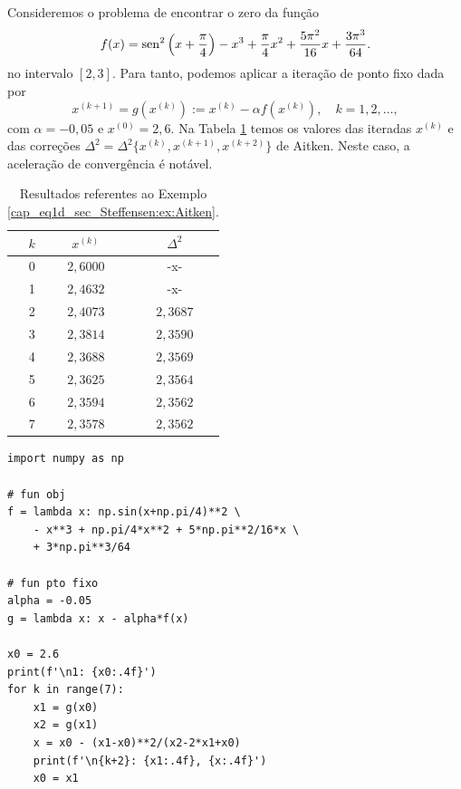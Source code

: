 \begin{ex}\label{cap_eq1d_sec_Steffensen:ex:Aitken}
  Consideremos o problema de encontrar o zero da função
  \begin{equation}
    f(x) = \operatorname{sen}^2\left(x+\frac{\pi}{4}\right) - x^3 + \frac{\pi}{4}x^2 + \frac{5\pi^2}{16}x + \frac{3\pi^3}{64}.
  \end{equation}
  no intervalo $[2,3]$. Para tanto, podemos aplicar a iteração de ponto fixo dada por
  \begin{equation}
    x^{(k+1)} = g(x^{(k)}) := x^{(k)} - \alpha f(x^{(k)}),\quad k=1,2,\ldots,
  \end{equation}
com $\alpha=-0,05$ e $x^{(0)}=2,6$. Na Tabela \ref{cap_eq1d_sec_Steffensen:tab:ex_Aitken} temos os valores das iteradas $x^{(k)}$ e das correções $\Delta^2 = \Delta^2\{x^{(k)},x^{(k+1)},x^{(k+2)}\}$ de Aitken. Neste caso, a aceleração de convergência é notável.

\begin{table}[H]
  \centering
  \caption{Resultados referentes ao Exemplo \ref{cap_eq1d_sec_Steffensen:ex:Aitken}.}
  \label{cap_eq1d_sec_Steffensen:tab:ex_Aitken}
  \begin{tabular}{r|cc}
    $k$ & $x^{(k)}$ & $\Delta^2$ \\\hline
    0 & $2,6000$ & -x- \\
    1 & $2,4632$ & -x- \\
    2 & $2,4073$ & $2,3687$ \\
    3 & $2,3814$ & $2,3590$ \\
    4 & $2,3688$ & $2,3569$ \\
    5 & $2,3625$ & $2,3564$ \\
    6 & $2,3594$ & $2,3562$ \\
    7 & $2,3578$ & $2,3562$ \\\hline
  \end{tabular}
\end{table}

\begin{lstlisting}
import numpy as np

# fun obj
f = lambda x: np.sin(x+np.pi/4)**2 \
    - x**3 + np.pi/4*x**2 + 5*np.pi**2/16*x \
    + 3*np.pi**3/64

# fun pto fixo
alpha = -0.05
g = lambda x: x - alpha*f(x)

x0 = 2.6
print(f'\n1: {x0:.4f}')
for k in range(7):
    x1 = g(x0)
    x2 = g(x1)
    x = x0 - (x1-x0)**2/(x2-2*x1+x0)
    print(f'\n{k+2}: {x1:.4f}, {x:.4f}')
    x0 = x1
\end{lstlisting}
\end{ex}

